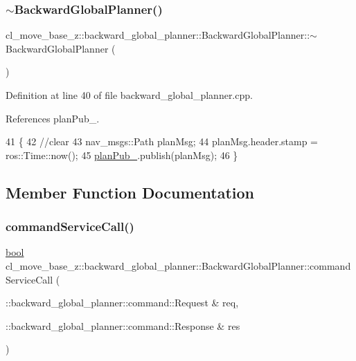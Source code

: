 \subsubsection{\texorpdfstring{$\sim$\+Backward\+Global\+Planner()}{~BackwardGlobalPlanner()}}
{\footnotesize\ttfamily cl\+\_\+move\+\_\+base\+\_\+z\+::backward\+\_\+global\+\_\+planner\+::\+Backward\+Global\+Planner\+::$\sim$\+Backward\+Global\+Planner (\begin{DoxyParamCaption}{ }\end{DoxyParamCaption})\hspace{0.3cm}{\ttfamily [virtual]}}



Definition at line 40 of file backward\+\_\+global\+\_\+planner.\+cpp.



References plan\+Pub\+\_\+.


\begin{DoxyCode}
41 \{
42     \textcolor{comment}{//clear}
43     nav\_msgs::Path planMsg;
44     planMsg.header.stamp = ros::Time::now();
45     \hyperlink{classcl__move__base__z_1_1backward__global__planner_1_1BackwardGlobalPlanner_a561eab039140948c52ec928c191f3f43}{planPub\_}.publish(planMsg);
46 \}
\end{DoxyCode}


\subsection{Member Function Documentation}
\mbox{\label{classcl__move__base__z_1_1backward__global__planner_1_1BackwardGlobalPlanner_a399a3dd0a3f8c781be06158e3238a5d9}} 
\subsubsection{\texorpdfstring{command\+Service\+Call()}{commandServiceCall()}}
{\footnotesize\ttfamily \hyperlink{classbool}{bool} cl\+\_\+move\+\_\+base\+\_\+z\+::backward\+\_\+global\+\_\+planner\+::\+Backward\+Global\+Planner\+::command\+Service\+Call (\begin{DoxyParamCaption}\item[{\+::backward\+\_\+global\+\_\+planner\+::command\+::\+Request \&}]{req,  }\item[{\+::backward\+\_\+global\+\_\+planner\+::command\+::\+Response \&}]{res }\end{DoxyParamCaption})\hspace{0.3cm}{\ttfamily [private]}}

